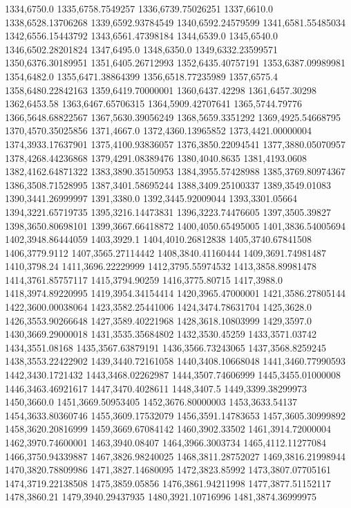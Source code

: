1334,6750.0
1335,6758.7549257
1336,6739.75026251
1337,6610.0
1338,6528.13706268
1339,6592.93784549
1340,6592.24579599
1341,6581.55485034
1342,6556.15443792
1343,6561.47398184
1344,6539.0
1345,6540.0
1346,6502.28201824
1347,6495.0
1348,6350.0
1349,6332.23599571
1350,6376.30189951
1351,6405.26712993
1352,6435.40757191
1353,6387.09989981
1354,6482.0
1355,6471.38864399
1356,6518.77235989
1357,6575.4
1358,6480.22842163
1359,6419.70000001
1360,6437.42298
1361,6457.30298
1362,6453.58
1363,6467.65706315
1364,5909.42707641
1365,5744.79776
1366,5648.68822567
1367,5630.39056249
1368,5659.3351292
1369,4925.54668795
1370,4570.35025856
1371,4667.0
1372,4360.13965852
1373,4421.00000004
1374,3933.17637901
1375,4100.93836057
1376,3850.22094541
1377,3880.05070957
1378,4268.44236868
1379,4291.08389476
1380,4040.8635
1381,4193.0608
1382,4162.64871322
1383,3890.35150953
1384,3955.57428988
1385,3769.80974367
1386,3508.71528995
1387,3401.58695244
1388,3409.25100337
1389,3549.01083
1390,3441.26999997
1391,3380.0
1392,3445.92009044
1393,3301.05664
1394,3221.65719735
1395,3216.14473831
1396,3223.74476605
1397,3505.39827
1398,3650.80698101
1399,3667.66418872
1400,4050.65495005
1401,3836.54005694
1402,3948.86444059
1403,3929.1
1404,4010.26812838
1405,3740.67841508
1406,3779.9112
1407,3565.27114442
1408,3840.41160444
1409,3691.74981487
1410,3798.24
1411,3696.22229999
1412,3795.55974532
1413,3858.89981478
1414,3761.85757117
1415,3794.90259
1416,3775.80715
1417,3988.0
1418,3974.89220995
1419,3954.34154414
1420,3965.47000001
1421,3586.27805144
1422,3600.00038064
1423,3582.25441006
1424,3474.78631704
1425,3628.0
1426,3553.90266648
1427,3589.40221968
1428,3618.10803999
1429,3597.0
1430,3669.29000018
1431,3535.35684802
1432,3530.45259
1433,3571.03742
1434,3551.08168
1435,3567.63879191
1436,3566.73243065
1437,3568.8259245
1438,3553.22422902
1439,3440.72161058
1440,3408.10668048
1441,3460.77990593
1442,3430.1721432
1443,3468.02262987
1444,3507.74606999
1445,3455.01000008
1446,3463.46921617
1447,3470.4028611
1448,3407.5
1449,3399.38299973
1450,3660.0
1451,3669.50953405
1452,3676.80000003
1453,3633.54137
1454,3633.80360746
1455,3609.17532079
1456,3591.14783653
1457,3605.30999892
1458,3620.20816999
1459,3669.67084142
1460,3902.33502
1461,3914.72000004
1462,3970.74600001
1463,3940.08407
1464,3966.3003734
1465,4112.11277084
1466,3750.94339887
1467,3826.98240025
1468,3811.28752027
1469,3816.21998944
1470,3820.78809986
1471,3827.14680095
1472,3823.85992
1473,3807.07705161
1474,3719.22138508
1475,3859.05856
1476,3861.94211998
1477,3877.51152117
1478,3860.21
1479,3940.29437935
1480,3921.10716996
1481,3874.36999975
